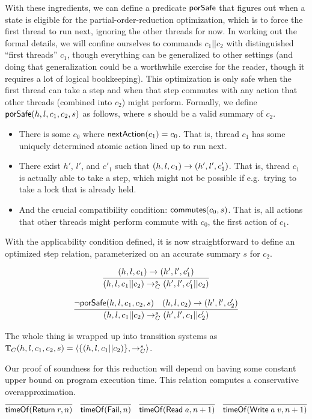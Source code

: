 \documentclass{amsbook}
\theoremstyle{definition}
\theoremstyle{remark}
\numberwithin{section}{chapter}
\numberwithin{equation}{chapter}
\begin{document}
With these ingredients, we can define a predicate $\mathsf{porSafe}$ that figures out when a state is eligible for the partial-order-reduction optimization, which is to force the first thread to run next, ignoring the other threads for now.
In working out the formal details, we will confine ourselves to commands $c_1 || c_2$ with distinguished ``first threads'' $c_1$, though everything can be generalized to other settings (and doing that generalization could be a worthwhile exercise for the reader, though it requires a lot of logical bookkeeping).
This optimization is only safe when the first thread can take a step and when that step commutes with any action that other threads (combined into $c_2$) might perform.
Formally, we define $\mathsf{porSafe}(h, l, c_1, c_2, s)$ as follows, where $s$ should be a valid summary of $c_2$.
\begin{itemize}
\item There is some $c_0$ where $\mathsf{nextAction}(c_1) = c_0$.  That is, thread $c_1$ has some uniquely determined atomic action lined up to run next.
\item There exist $h'$, $l'$, and $c'_1$ such that $(h, l, c_1) \to (h', l', c'_1)$.  That is, thread $c_1$ is actually able to take a step, which might not be possible if e.g.\ trying to take a lock that is already held.
\item And the crucial compatibility condition: $\mathsf{commutes}(c_0, s)$.  That is, all actions that other threads might perform commute with $c_0$, the first action of $c_1$.
\end{itemize}

\newcommand{\smallstepC}[3]{#1 \to_C^{#2} #3}

With the applicability condition defined, it is now straightforward to define an optimized step relation, parameterized on an accurate summary $s$ for $c_2$.

$$\infer{\smallstepC{(h, l, c_1 || c_2)}{s}{(h', l', c'_1 || c_2)}}{
  \smallstep{(h, l, c_1)}{(h', l', c'_1)}
}$$

$$\infer{\smallstepC{(h, l, c_1 || c_2)}{s}{(h', l', c_1 || c'_2)}}{
  \neg \pors{h, l, c_1, c_2, s}
  & \smallstep{(h, l, c_2)}{(h', l', c'_2)}
}$$

The whole thing is wrapped up into transition systems as $\mathbb T_C(h, l, c_1, c_2, s) = {\left \langle \{(h, l, c_1 || c_2)\}, \to_C^s \right \rangle}$.

\newcommand{\tof}[2]{\mt{timeOf}(#1, #2)}

Our proof of soundness for this reduction will depend on having some constant upper bound on program execution time.
This relation computes a conservative overapproximation.
$$\infer{\tof{\mt{Return} \; r}{n}}{}
\quad \infer{\tof{\mt{Fail}}{n}}{}
\quad \infer{\tof{\mt{Read} \; a}{n+1}}{}
\quad \infer{\tof{\mt{Write} \; a \; v}{n+1}}{}$$
\end{document}
